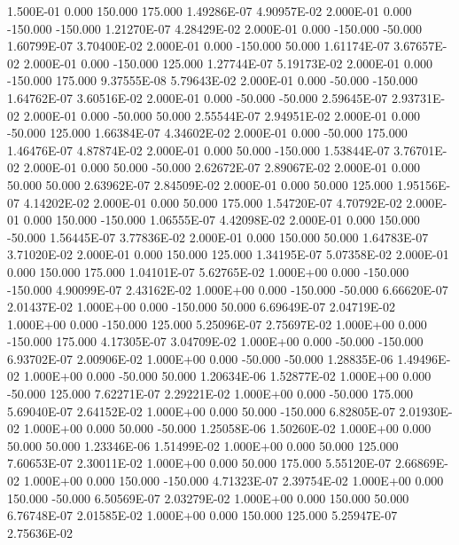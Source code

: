   1.500E-01     0.000   150.000   175.000 1.49286E-07 4.90957E-02
  2.000E-01     0.000  -150.000  -150.000 1.21270E-07 4.28429E-02
  2.000E-01     0.000  -150.000   -50.000 1.60799E-07 3.70400E-02
  2.000E-01     0.000  -150.000    50.000 1.61174E-07 3.67657E-02
  2.000E-01     0.000  -150.000   125.000 1.27744E-07 5.19173E-02
  2.000E-01     0.000  -150.000   175.000 9.37555E-08 5.79643E-02
  2.000E-01     0.000   -50.000  -150.000 1.64762E-07 3.60516E-02
  2.000E-01     0.000   -50.000   -50.000 2.59645E-07 2.93731E-02
  2.000E-01     0.000   -50.000    50.000 2.55544E-07 2.94951E-02
  2.000E-01     0.000   -50.000   125.000 1.66384E-07 4.34602E-02
  2.000E-01     0.000   -50.000   175.000 1.46476E-07 4.87874E-02
  2.000E-01     0.000    50.000  -150.000 1.53844E-07 3.76701E-02
  2.000E-01     0.000    50.000   -50.000 2.62672E-07 2.89067E-02
  2.000E-01     0.000    50.000    50.000 2.63962E-07 2.84509E-02
  2.000E-01     0.000    50.000   125.000 1.95156E-07 4.14202E-02
  2.000E-01     0.000    50.000   175.000 1.54720E-07 4.70792E-02
  2.000E-01     0.000   150.000  -150.000 1.06555E-07 4.42098E-02
  2.000E-01     0.000   150.000   -50.000 1.56445E-07 3.77836E-02
  2.000E-01     0.000   150.000    50.000 1.64783E-07 3.71020E-02
  2.000E-01     0.000   150.000   125.000 1.34195E-07 5.07358E-02
  2.000E-01     0.000   150.000   175.000 1.04101E-07 5.62765E-02
  1.000E+00     0.000  -150.000  -150.000 4.90099E-07 2.43162E-02
  1.000E+00     0.000  -150.000   -50.000 6.66620E-07 2.01437E-02
  1.000E+00     0.000  -150.000    50.000 6.69649E-07 2.04719E-02
  1.000E+00     0.000  -150.000   125.000 5.25096E-07 2.75697E-02
  1.000E+00     0.000  -150.000   175.000 4.17305E-07 3.04709E-02
  1.000E+00     0.000   -50.000  -150.000 6.93702E-07 2.00906E-02
  1.000E+00     0.000   -50.000   -50.000 1.28835E-06 1.49496E-02
  1.000E+00     0.000   -50.000    50.000 1.20634E-06 1.52877E-02
  1.000E+00     0.000   -50.000   125.000 7.62271E-07 2.29221E-02
  1.000E+00     0.000   -50.000   175.000 5.69040E-07 2.64152E-02
  1.000E+00     0.000    50.000  -150.000 6.82805E-07 2.01930E-02
  1.000E+00     0.000    50.000   -50.000 1.25058E-06 1.50260E-02
  1.000E+00     0.000    50.000    50.000 1.23346E-06 1.51499E-02
  1.000E+00     0.000    50.000   125.000 7.60653E-07 2.30011E-02
  1.000E+00     0.000    50.000   175.000 5.55120E-07 2.66869E-02
  1.000E+00     0.000   150.000  -150.000 4.71323E-07 2.39754E-02
  1.000E+00     0.000   150.000   -50.000 6.50569E-07 2.03279E-02
  1.000E+00     0.000   150.000    50.000 6.76748E-07 2.01585E-02
  1.000E+00     0.000   150.000   125.000 5.25947E-07 2.75636E-02

